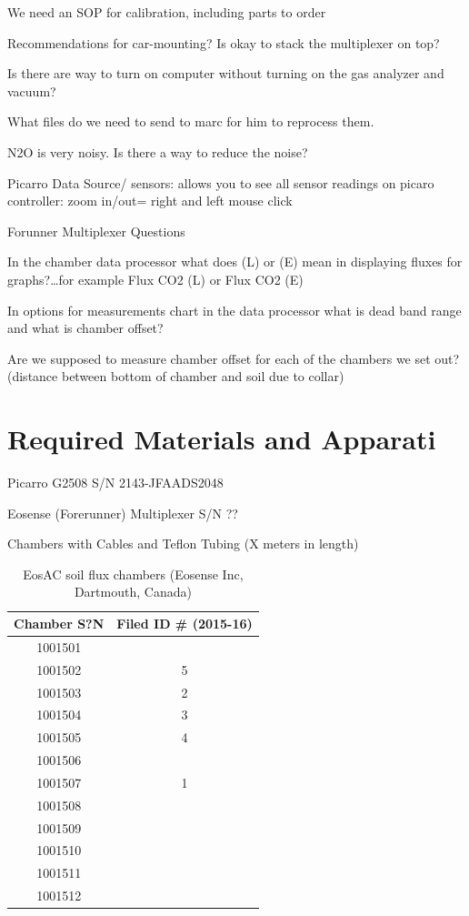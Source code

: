 \documentclass[12pt]{../SOP3}\usepackage[]{graphicx}\usepackage[]{color}
\begin{document}
\NP We need an SOP for calibration, including parts to order

\NP Recommendations for car-mounting? Is okay to stack the multiplexer on top?

\NP Is there are way to turn on computer without turning on the gas analyzer and vacuum? 

\NP What files do we need to send to marc for him to reprocess them.

\NP N2O is very noisy. Is there a way to reduce the noise?

Picarro
Data Source/ sensors: allows you to see all sensor readings on picaro
controller: zoom in/out= right and left mouse click






Forunner Multiplexer Questions

\NP In the chamber data processor what does (L) or (E) mean in displaying fluxes for graphs?\ldots for example Flux CO2 (L) or Flux CO2 (E) 

\NP In options for measurements chart in the data processor what is dead band range and what is chamber offset? 

\NP Are we supposed to measure chamber offset for each of the chambers we set out? (distance between bottom of chamber and soil due to collar)


\section{Required Materials and Apparati}

\NP Picarro G2508 S/N 2143-JFAADS2048

\NP Eosense (Forerunner) Multiplexer S/N ??

\NP Chambers with Cables and Teflon Tubing (X meters in length)

\begin{table}
\caption{EosAC soil flux chambers (Eosense Inc, Dartmouth, Canada)}
\begin{tabular}{cc} \hline
Chamber S?N   & Filed ID \# (2015-16)  \\ \hline\hline
1001501       &         \\
1001502       &  5       \\
1001503       &  2       \\
1001504       &   3      \\
1001505       &   4      \\
1001506       &         \\
1001507       &  1       \\
1001508       &         \\
1001509       &         \\
1001510       &         \\
1001511       &         \\
1001512       &         \\ \hline
\end{tabular}
\end{table}
\end{document}
